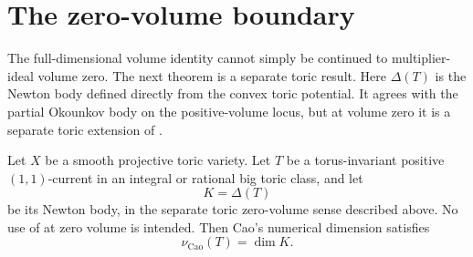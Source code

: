 %
\section{The zero-volume boundary}

The full-dimensional volume identity cannot simply be continued to
multiplier-ideal volume zero.
The next theorem is a separate toric result.
Here \(\Delta(T)\) is the Newton body defined directly from the convex
toric potential.  It agrees with the partial Okounkov body on the
positive-volume locus, but at volume zero it is a separate toric extension
of .

\begin{theorem}\label{thm:ok-toric-zero-mass}
Let \(X\) be a smooth projective toric variety.
Let \(T\) be a torus-invariant positive \((1,1)\)-current in an integral or
rational big toric class, and let
\[
                             K=\Delta(T)
\]
be its Newton body, in the separate toric zero-volume sense described
above.  No use of  at zero volume is
intended.
Then Cao's numerical dimension satisfies
\[
                         \nu_{\mathrm{Cao}}(T)=\dim K.
\tag{55.50}\label{eq:ok-toric-numdim}
\]
\end{theorem}

